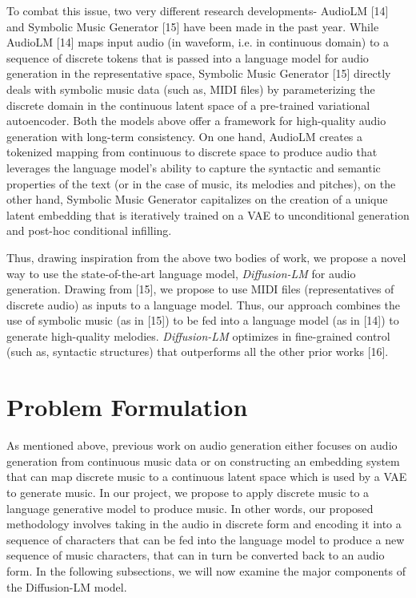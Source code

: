 \documentclass{article}
\begin{document}
To combat this issue, two very different research developments- AudioLM [14] and Symbolic Music Generator [15] have been made in the past year. While AudioLM [14] maps input audio (in waveform, i.e. in continuous domain) to a sequence of discrete tokens that is passed into a language model for audio generation in the representative space, Symbolic Music Generator [15] directly deals with symbolic music data (such as, MIDI files) by parameterizing the discrete domain in the continuous latent space of a pre-trained variational autoencoder. Both the models above offer a framework for high-quality audio generation with long-term consistency. On one hand, AudioLM creates a tokenized mapping from continuous to discrete space to produce audio that leverages the language model's ability to capture the syntactic and semantic properties of the text (or in the case of music, its melodies and pitches), on the other hand, Symbolic Music Generator capitalizes on the creation of a unique latent embedding that is iteratively trained on a VAE to unconditional generation and post-hoc conditional infilling. 

Thus, drawing inspiration from the above two bodies of work, we propose a novel way to use the state-of-the-art language model, \textit{Diffusion-LM} for audio generation. Drawing from [15], we propose to use MIDI files (representatives of discrete audio) as inputs to a language model. Thus, our approach combines the use of symbolic music (as in [15]) to be fed into a language model (as in [14]) to generate high-quality melodies. \textit{Diffusion-LM} optimizes in fine-grained control (such as, syntactic structures) that outperforms all the other prior works [16]. 


\section{Problem Formulation}

As mentioned above, previous work on audio generation either focuses on audio generation from continuous music data or on constructing an embedding system that can map discrete music to a continuous latent space which is used by a VAE to generate music. In our project, we propose to apply discrete music to a language generative model to produce music. In other words, our proposed methodology involves taking in the audio in discrete form and encoding it into a sequence of characters that can be fed into the language model to produce a new sequence of music characters, that can in turn be converted back to an audio form. In the following subsections, we will now examine the major components of the Diffusion-LM model. 
\end{document}
